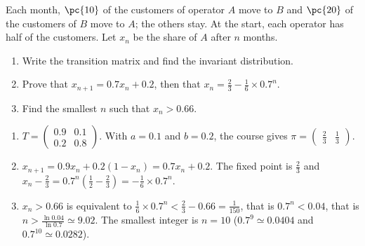 \begin{exercise}
Each month, $\pc{10}$ of the customers of operator $A$ move to $B$ and $\pc{20}$ of the customers of $B$ move to $A$; the others stay. At the start, each operator has half of the customers. Let $x_n$ be the share of $A$ after $n$ months.
\begin{enumerate}
\item Write the transition matrix and find the invariant distribution.
\item Prove that $x_{n+1}=\num{0,7}x_n+\num{0,2}$, then that $x_n=\frac23-\frac16\times\num{0,7}^n$.
\item Find the smallest $n$ such that $x_n>\num{0,66}$.
\end{enumerate}
\end{exercise}
\begin{solution}
\begin{enumerate}
\item $T=\begin{pmatrix}\num{0,9}&\num{0,1}\\\num{0,2}&\num{0,8}\end{pmatrix}$. With $a=\num{0,1}$ and $b=\num{0,2}$, the course gives $\pi=\begin{pmatrix}\frac23&\frac13\end{pmatrix}$.
\item $x_{n+1}=\num{0,9}x_n+\num{0,2}(1-x_n)=\num{0,7}x_n+\num{0,2}$. The fixed point is $\frac23$ and $x_n-\frac23=\num{0,7}^n\left(\frac12-\frac23\right)=-\frac16\times\num{0,7}^n$.
\item $x_n>\num{0,66}$ is equivalent to $\frac16\times\num{0,7}^n<\frac23-\num{0,66}=\frac1{150}$, that is $\num{0,7}^n<\num{0,04}$, that is $n>\frac{\ln\num{0,04}}{\ln\num{0,7}}\simeq\num{9,02}$. The smallest integer is $n=10$ ($\num{0,7}^9\simeq\num{0,0404}$ and $\num{0,7}^{10}\simeq\num{0,0282}$).
\end{enumerate}
\end{solution}

